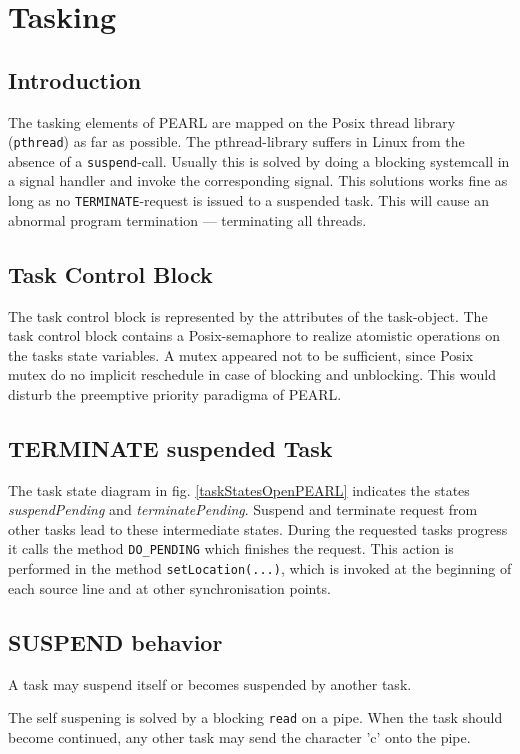 \section{Tasking}


\subsection{Introduction}
The tasking elements of PEARL are mapped on the Posix thread library 
(\verb|pthread|) as far as possible. 
The pthread-library suffers in Linux from the absence of a \verb|suspend|-call.
Usually this is solved by doing a blocking systemcall in a signal handler and
invoke the corresponding signal.
This solutions works fine as long as no \verb|TERMINATE|-request is
issued to a suspended task. This will cause an abnormal program
termination --- terminating all threads. 


\subsection{Task Control Block}
The task control block is represented by the attributes of the 
task-object. 
The task control block contains a Posix-semaphore to realize atomistic
operations on the tasks state variables.
A mutex appeared not to be sufficient, since
Posix mutex do no implicit reschedule in case of blocking and unblocking.
This would disturb the preemptive priority  paradigma of PEARL.

\subsection{TERMINATE suspended Task}
The task state diagram in  fig. \ref{taskStatesOpenPEARL} indicates the states
{\em suspendPending} and {\em terminatePending}.
Suspend and terminate request from other tasks lead to these
 intermediate states.
During the requested tasks progress it calls the method \verb|DO_PENDING| which
finishes the request. This action is performed in the method 
\verb|setLocation(...)|, which is invoked at the beginning of each source line
and at other synchronisation points.


\subsection{SUSPEND behavior}
A task may suspend itself or becomes suspended by another task.

The self suspening is solved by a blocking \verb|read| on a pipe.
When the task should become continued,
 any other task may send the character 'c' onto the pipe.

